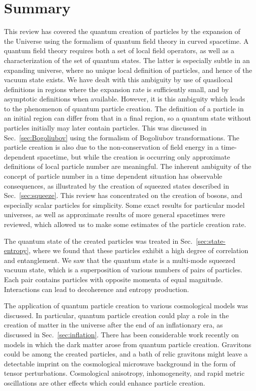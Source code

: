 \documentclass[12pt,onecolumn,eqsecnum,floats,aps,prd,floatfix,titlepage]{revtex4-2}
\begin{document}
\section{Summary}
\label{sec:final}

This review has covered  the quantum creation of particles by the  expansion of the Universe using the formalism of quantum field theory in curved
spacetime. A quantum field theory requires both a set of local field operators, as well as a characterization of the set of quantum states. The latter
is especially subtle in an expanding universe, where no unique local definition of particles, and hence of the vacuum state exists. We have dealt with 
this ambiguity by use of quasilocal definitions in regions where the expansion rate is sufficiently small, and by asymptotic definitions when
available. However, it is this ambiguity which leads to the phenomenon of quantum particle creation. The definition of a particle in an initial region
can differ from that in a final region, so a quantum state without particles initially may later contain particles. This was discussed in Sec.~\ref{sec:Bogoliubov}
using the formalism of Bogoliubov transformations. The particle creation is also due to the non-conservation of field energy in a time-dependent
spacetime, but while the creation is occurring only approximate definitions of local particle number are meaningful. The inherent ambiguity of the
concept of particle number in a time dependent situation has observable consequences, as illustrated by the creation of squeezed states described
in Sec.~\ref{sec:squeeze}.
This review has concentrated on the creation of bosons, and especially scalar particles for
simplicity. Some exact results for particular model universes, as well as approximate results of more general spacetimes were reviewed, which 
allowed us to make some estimates of the particle creation rate. 

The quantum state of the created particles was treated in Sec.~\ref{sec:state-entropy}, where we found that these particles exhibit a high degree
of correlation and entanglement. We saw that the quantum state is a multi-mode squeezed vacuum state, which is a superposition of various numbers of
pairs of particles. Each pair contains particles with opposite momenta of equal magnitude. Interactions can lead to decoherence and entropy production.

The application of quantum particle creation to various cosmological models was discussed. In particular, quantum particle creation could play a role in the 
creation of matter in the universe after the end of an inflationary era, as discussed in Sec.~\ref{sec:inflation}.  There has been considerable work recently 
on models in which the dark matter arose from quantum particle creation.  Gravitons could be among the created particles, and a bath of relic gravitons
might leave a detectable imprint on the cosmological microwave background in the form of tensor perturbations. Cosmological anisotropy, inhomogeneity,
and rapid metric oscillations are other effects which could enhance particle creation.
\end{document}
